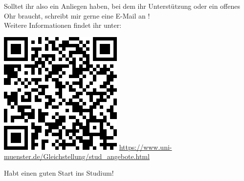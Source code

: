 \begin{multicols}{2}
Solltet ihr also ein Anliegen haben, bei dem ihr Unterstützung oder ein offenes Ohr braucht, schreibt mir gerne eine E-Mail an !\\

Weitere Informationen findet ihr unter: \\
\begin{center}
  \includegraphics[width=0.7\columnwidth]{res/StudzGB.png}
  \smallskip
  \url{https://www.uni-muenster.de/Gleichstellung/stud\_angebote.html} 
\end{center}

Habt einen guten Start ins Studium!
 
 
\end{multicols}
